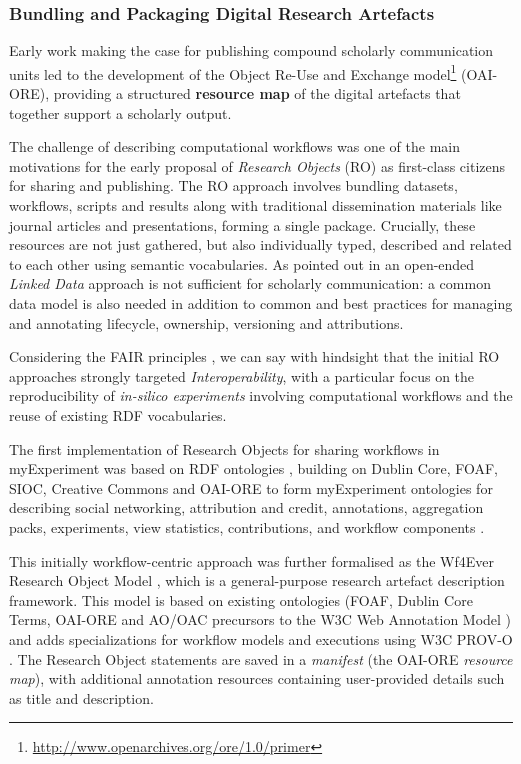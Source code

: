 \subsubsection{Bundling and Packaging Digital Research
Artefacts}\label{ch5:bundling-and-packaging-digital-research-artefacts}

Early work making the case for publishing compound scholarly
communication units
\cite{ch5-117}
led to the development of the
Object Re-Use and Exchange
model\footnote{\url{http://www.openarchives.org/ore/1.0/primer}} (OAI-ORE), providing a structured \textbf{resource map}
of the digital artefacts that together support a scholarly output.

The challenge of describing computational workflows was one of the main
motivations for the early proposal of \emph{Research Objects} (RO)
\cite{Bechhofer 2013}
as first-class citizens for sharing and publishing. The RO approach
involves bundling datasets, workflows, scripts and results along with
traditional dissemination materials like journal articles and
presentations, forming a single package. Crucially, these resources are
not just gathered, but also individually typed, described and related to
each other using semantic vocabularies. As pointed out in
\cite{Bechhofer 2013} an
open-ended \emph{Linked Data} approach is not sufficient for scholarly
communication: a common data model is also needed in addition to common
and best practices for managing and annotating lifecycle, ownership,
versioning and attributions.

Considering the FAIR principles
\cite{ch5-123}, we can say with
hindsight that the initial RO approaches strongly targeted
\emph{Interoperability}, with a particular focus on the reproducibility
of \emph{in-silico experiments} involving computational workflows and
the reuse of existing RDF vocabularies.

The first implementation of Research Objects for sharing workflows in
myExperiment \cite{ch5-57} was
based on RDF ontologies
\cite{ch5-93}, building on
Dublin Core, FOAF, SIOC, Creative Commons and OAI-ORE to form
myExperiment ontologies for describing social networking, attribution
and credit, annotations, aggregation packs, experiments, view
statistics, contributions, and workflow components
\cite{ch5-92}.

This initially workflow-centric approach was further formalised as the
Wf4Ever Research Object Model
\cite{Belhajjame 2015}, which is
a general-purpose research artefact description framework. This model is
based on existing ontologies (FOAF, Dublin Core Terms, OAI-ORE and
AO/OAC precursors to the W3C Web Annotation Model
\cite{Ciccarese 2017})
and adds specializations for workflow models and executions using W3C
PROV-O \cite{ch5-81}.
The Research Object statements are saved in a \emph{manifest} (the
OAI-ORE \emph{resource map}), with additional annotation resources
containing user-provided details such as title and description.

